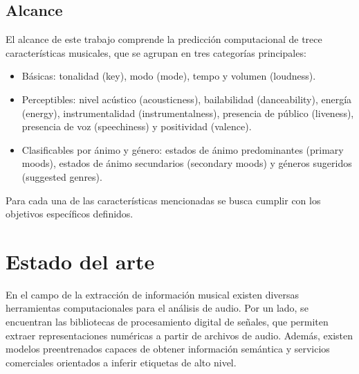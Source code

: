 \subsection{Alcance}

El alcance de este trabajo comprende la predicción computacional de trece características musicales, que se agrupan en tres categorías principales:

\begin{itemize}
    \item Básicas: tonalidad (key), modo (mode), tempo y volumen (loudness).
    \item Perceptibles: nivel acústico (acousticness), bailabilidad (danceability), energía (energy), instrumentalidad (instrumentalness), presencia de público (liveness), presencia de voz (speechiness) y positividad (valence).
    \item Clasificables por ánimo y género: estados de ánimo predominantes (primary moods), estados de ánimo secundarios (secondary moods) y géneros sugeridos (suggested genres).
\end{itemize}

Para cada una de las características mencionadas se busca cumplir con los objetivos específicos definidos.




\section{Estado del arte}


En el campo de la extracción de información musical existen diversas herramientas computacionales para el análisis de audio. Por un lado, se encuentran las bibliotecas de procesamiento digital de señales, que permiten extraer representaciones numéricas a partir de archivos de audio. Además, existen modelos preentrenados capaces de obtener información semántica y servicios comerciales orientados a inferir etiquetas de alto nivel.

